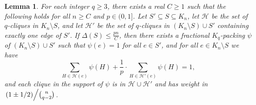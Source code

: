 \documentclass[11pt]{article}
\numberwithin{equation}{section}
\newcommand{\mc}[1]{\mathcal{#1}}
\newcounter{i}
\theoremstyle{plain}
\newtheorem{lem}[thm]{Lemma}
\theoremstyle{plain} %
\theoremstyle{definition}
\newcommand{\cH}{\mathcal{H}}
\begin{document}
\begin{lem}\label{lem:YusterFractionalPrelim}
For each integer $q\ge 3$, there exists a real $C \ge 1$ such that the following holds for all $n \geq C$ and $p \in (0,1]$.
Let $S'\subseteq S\subseteq K_n$, let $\mc{H}$ be the set of $q$-cliques in $K_n\setminus S$, and let $\mc{H}'$ be the set of $q$-cliques in $(K_n\setminus S)\cup S'$ containing exactly one edge of $S'$. If $\Delta(S) \le \frac{pn}{C}$, then there exists a fractional $K_q$-packing $\psi$ of $(K_n\setminus S) \cup S'$ such that $\psi(e)=1$ for all $e\in S'$, and for all $e\in K_n\setminus S$ we have 
$$\sum_{H \in \cH(e)} \psi(H) + \frac{1}{p}\cdot \sum_{H \in \cH'(e)} \psi(H)= 1,$$ 
 and each clique in the support of $\psi$ is in $\cH \cup \cH'$ and has weight in $\left.(1 \pm 1/2) \middle/\binom{n}{q-2}\right.$.
\end{lem}
\end{document}
